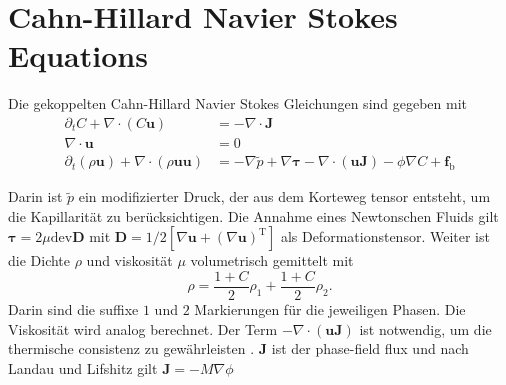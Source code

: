 \section{Cahn-Hillard Navier Stokes Equations}
Die gekoppelten Cahn-Hillard Navier Stokes Gleichungen sind gegeben mit
\begin{align}
    \partial_t C + \nabla \cdot \left( C \mathbf{u} \right) &= -\nabla \cdot \mathbf{J} \\
    \nabla \cdot \mathbf{u} &= 0 \\
    \label{eq: NSEChanged}
    \partial_t(\rho \mathbf{u}) + \nabla \cdot (\rho \mathbf{u}\mathbf{u})&= -\nabla \tilde{p} + \nabla \mathbf{\tau} - \nabla \cdot(\mathbf{u}\mathbf{J})-\phi\nabla C + \mathbf{f}_{\mathrm{b}}
\end{align}

Darin ist $\tilde{p}$ ein modifizierter Druck, der aus dem Korteweg tensor entsteht, um die Kapillarität zu berücksichtigen. Die Annahme eines Newtonschen Fluids gilt $\mathbf{\tau} = 2\mu \mathrm{dev}\mathbf{D}$ mit $\mathbf{D} = 1/2[\nabla \mathbf{u}+(\nabla \mathbf{u})^{\mathrm{T}}]$ als Deformationstensor. Weiter ist die Dichte $\rho$ und viskosität $\mu$ volumetrisch gemittelt mit 
\begin{equation}
    \rho = \frac{1 + C}{2} \rho_1 +\frac{1 + C}{2} \rho_2.
\end{equation} 
Darin sind die suffixe $1$ und $2$ Markierungen für die jeweiligen Phasen. Die Viskosität wird analog berechnet. Der Term $- \nabla \cdot(\mathbf{u}\mathbf{J})$ ist notwendig, um die thermische consistenz zu gewährleisten \cite{ding2007DiffuseInterfaceModel}. $\mathbf{J}$ ist der phase-field flux und nach Landau und Lifshitz  gilt $\mathbf{J} = -M\nabla \phi$ 